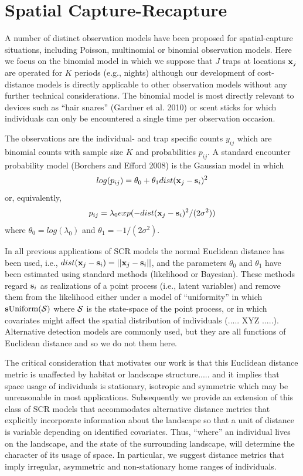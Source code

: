 \section{Spatial Capture-Recapture}

A number of distinct observation models have been proposed for
spatial-capture situations, including Poisson, multinomial or binomial
observation models. Here we focus on the binomial model in which we
suppose that $J$ traps at locations ${\bf x}_{j}$ are operated for $K$
periods (e.g., nights) although our development of cost-distance
models is directly applicable to other observation models without any
further technical considerations. The binomial model is most directly
relevant to devices such as ``hair snares'' (Gardner et al. 2010) or
scent sticks \citep{kery_etal:2010} for which individuals can only be
encountered a single time per observation occasion.

The observations are the individual- and trap specific counts $y_{ij}$
which are binomial counts with sample size $K$ and probabilities
$p_{ij}$. A standard encounter probability model (Borchers and Efford
2008) is the Gaussian model in which
\[
log(p_{ij})= \theta_{0} + \theta_{1} dist({\bf x}_{j} - {\bf s}_{i})^{2}
\]
or, equivalently, 
\[
p_{ij} = \lambda_{0} exp(-  dist({\bf x}_{j} - {\bf s}_{i})^{2}
/(2\sigma^{2}) )
\]
where $\theta_{0} = log(\lambda_{0})$ and $\theta_{1} =
-1/(2\sigma^2)$. 

In all previous applications of SCR models the normal Euclidean
distance has been used, i.e., $ dist({\bf x}_{j} - {\bf s}_{i}) =
||{\bf x}_{j} - {\bf s}_{i}||$,
and the parameters $\theta_0$ and $\theta_1$
have been estimated using standard methods (likelihood or
Bayesian). These methods regard ${\bf s}_{i}$ as realizations of a
point process (i.e., latent variables) and remove them from the
likelihood either under a model of ``uniformity'' in which ${\bf s}
\mbox{Uniform}({\cal S})$ where ${\cal S}$ is the state-space of the
point process, or in which covariates might affect the spatial
distribution of individuals (..... XYZ .....). Alternative detection
models are commonly used, but they are all functions of Euclidean
distance and so we do not them here. 

The critical consideration that motivates our work is that this 
 Euclidean distance metric is unaffected by habitat or landscape
structure..... and it implies that space usage of individuals is
stationary, isotropic and symmetric which may be unreasonable in most
applications. 
Subsequently we provide an extension of this class of SCR models that
accommodates alternative distance metrics that explicitly incorporate
information about the landscape so that a unit of distance is variable
depending on identified covariates. Thus, ``where'' an individual
lives on the landscape, and the state of the surrounding landscape,
will determine the character of its usage of space. In particular, we
suggest distance metrics that imply irregular, asymmetric and
non-stationary home ranges of individuals. 

